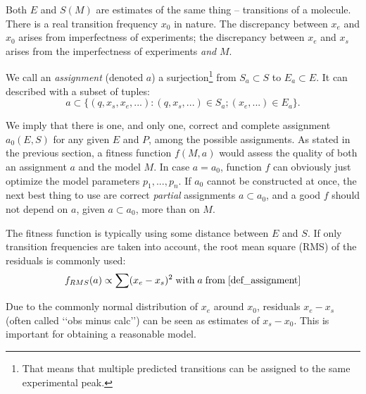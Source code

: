 \documentclass[11pt]{article}
\begin{document}
Both $E$ and $S(M)$ are estimates of the same thing -- transitions of a molecule. There is a real transition frequency $x_0$ in nature. The discrepancy between  $x_e$ and $x_0$ arises from imperfectness of experiments; the discrepancy between $x_e$ and $x_s$ arises from the imperfectness of experiments \emph{and} $M$.

We call an \emph{assignment} (denoted $a$) a surjection\footnote{That means that multiple predicted transitions can be assigned to the same experimental peak.} from $S_a \subset S$ to $E_a \subset E$. It can described with a subset of tuples: 
\begin{equation}
\label{def_assignment}
	a \subset \{(q, x_s, x_e, ...): (q, x_s, ...) \in S_a; (x_e, ...) \in E_a\}.
\end{equation}

We imply that there is one, and only one, correct and complete assignment $a_0(E, S)$ for any given $E$ and $P$, among the possible assignments. As stated in the previous section, a fitness function $f(M, a)$ would assess the quality of both an assignment $a$ and the model $M$. In case $a = a_0$, function $f$ can obviously just optimize the model parameters $p_1, ..., p_n$. If $a_0$ cannot be constructed at once, the next best thing to use are correct \emph{partial} assignments $a \subset a_0$, and a good $f$ should not depend on $a$, given $a \subset a_0$, more than on $M$.

The fitness function is typically using some distance between $E$ and $S$. If only transition frequencies are taken into account, the root mean square (RMS) of the residuals is commonly used:
\begin{equation}
\label{def_rms}
	f_{RMS}(a) \propto \sum (x_e - x_s)^2\;{\rm with}\;a\;{\rm from}\;\ref{def_assignment}
\end{equation}

Due to the commonly normal distribution of $x_e$ around $x_0$, residuals $x_e - x_s$ (often called \lq\lq{}obs minus calc\rq\rq{}) can be seen as estimates of $x_s - x_0$. This is important for obtaining a reasonable model. 

\end{document}

